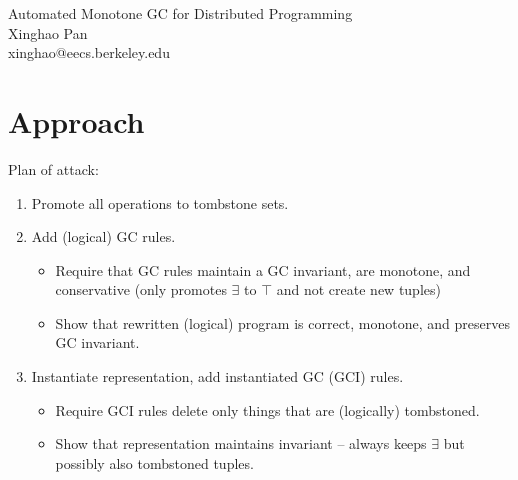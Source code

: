 \documentclass[10pt]{proc}
\numberwithin{equation}{section}
\begin{document}
\onecolumn
\begin{center}
{\LARGE Automated Monotone GC for Distributed Programming}
\\{\large Xinghao Pan\\xinghao@eecs.berkeley.edu}
\end{center}
\fancyhead{}
\fancyfoot{}
\rhead{\today}
\cfoot{\thepage}




\begin{abstract}
Edelweiss \cite{conway2014edelweiss} provides automatic garbage collection for event log exhanges, programs which monotonically accumulate logs.
However, in the process of doing so, it introduced additional points of coordination through non-monotone operations, thereby defeating the original purpose of ELEs to avoid synchronization and coordination.
In this paper, we show that garbage collection for ELEs can in fact be monotone and coordination-free.
We explicitly recast Edelweiss techniques as monotone operations on lattices defined over the input sets.
\end{abstract}

\section{Approach}
Plan of attack:
\begin{enumerate}
\item Promote all operations to tombstone sets.
\item Add (logical) GC rules.
  \begin{itemize}
  \item Require that GC rules maintain a GC invariant, are monotone, and conservative (only promotes $\exists$ to $\top$ and not create new tuples)
  \item Show that rewritten (logical) program is correct, monotone, and preserves GC invariant.
  \end{itemize}
\item Instantiate representation, add instantiated GC (GCI) rules.
  \begin{itemize}
  \item Require GCI rules delete only things that are (logically) tombstoned.
  \item Show that representation maintains invariant -- always keeps $\exists$ but possibly also tombstoned tuples.
  \end{itemize}
\end{enumerate}
\end{document}
